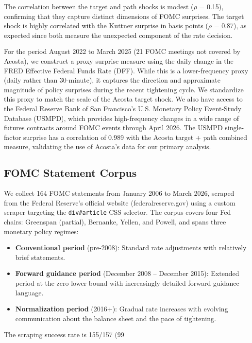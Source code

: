 \documentclass[12pt]{article}
\begin{document}
The correlation between the target and path shocks is modest ($\rho$ = 0.15), confirming that they capture distinct dimensions of FOMC surprises. The target shock is highly correlated with the Kuttner surprise in basis points ($\rho$ = 0.87), as expected since both measure the unexpected component of the rate decision.

For the period August 2022 to March 2025 (21 FOMC meetings not covered by Acosta), we construct a proxy surprise measure using the daily change in the FRED Effective Federal Funds Rate (DFF). While this is a lower-frequency proxy (daily rather than 30-minute), it captures the direction and approximate magnitude of policy surprises during the recent tightening cycle. We standardize this proxy to match the scale of the Acosta target shock. We also have access to the Federal Reserve Bank of San Francisco's U.S. Monetary Policy Event-Study Database (USMPD), which provides high-frequency changes in a wide range of futures contracts around FOMC events through April 2026. The USMPD single-factor surprise has a correlation of 0.989 with the Acosta target + path combined measure, validating the use of Acosta's data for our primary analysis.

\subsection{FOMC Statement Corpus}

We collect 164 FOMC statements from January 2006 to March 2026, scraped from the Federal Reserve's official website (federalreserve.gov) using a custom scraper targeting the \texttt{div#article} CSS selector. The corpus covers four Fed chairs: Greenspan (partial), Bernanke, Yellen, and Powell, and spans three monetary policy regimes:

\begin{itemize}
\item \textbf{Conventional period} (pre-2008): Standard rate adjustments with relatively brief statements.
\item \textbf{Forward guidance period} (December 2008 – December 2015): Extended period at the zero lower bound with increasingly detailed forward guidance language.
\item \textbf{Normalization period} (2016+): Gradual rate increases with evolving communication about the balance sheet and the pace of tightening.
\end{itemize}

The scraping success rate is 155/157 (99%
\end{document}
